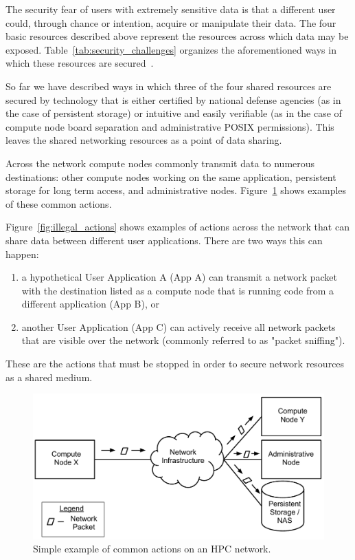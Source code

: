 \documentclass[oneside,12pt]{memoir}
\begin{document}
The security fear of users with extremely sensitive data is that a different user could, through chance or intention, acquire or manipulate their data. The four basic resources described above represent the resources across which data may be exposed. Table~\ref{tab:security_challenges} organizes the aforementioned ways in which these resources are secured~\cite{buyya1999high}. 

So far we have described ways in which three of the four shared resources are secured by technology that is either certified by national defense agencies (as in the case of persistent storage) or intuitive and easily verifiable (as in the case of compute node board separation and administrative POSIX permissions). This leaves the shared networking resources as a point of data sharing. 

Across the network compute nodes commonly transmit data to numerous destinations: other compute nodes working on the same application, persistent storage for long term access, and administrative nodes. Figure~\ref{fig:actions} shows examples of these common actions.

Figure~\ref{fig:illegal_actions} shows examples of actions across the network that can share data between different user applications. There are two ways this can happen: 
\begin{enumerate}
\item a hypothetical User Application A (App A) can transmit a network packet with the destination listed as a compute node that is running code from a different application (App B), or 
\item another User Application (App C) can actively receive all network packets that are visible over the network (commonly referred to as "packet sniffing").
\end{enumerate}

These are the actions that must be stopped in order to secure network resources as a shared medium.

\begin{figure}
\centering
\includegraphics[scale=0.6]{actions.pdf}
\caption{Simple example of common actions on an HPC network.}
\label{fig:actions}
\end{figure}
\end{document}
